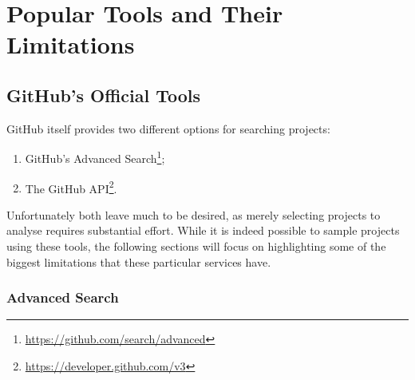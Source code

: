 \chapter{Popular Tools and Their Limitations}

\section{GitHub's Official Tools}

GitHub itself provides two different options for searching projects:
\begin{enumerate}
    \item GitHub's Advanced Search\footnote{\url{https://github.com/search/advanced}};
    \item The GitHub API\footnote{\url{https://developer.github.com/v3}}\@.
\end{enumerate}
Unfortunately both leave much to be desired, as merely selecting projects to analyse requires substantial effort.
While it is indeed possible to sample projects using these tools, the following sections will focus on highlighting some of the biggest limitations that these particular services have.

\subsection{Advanced Search}

